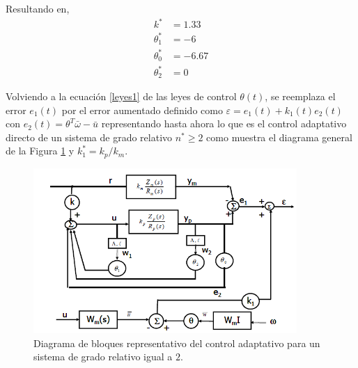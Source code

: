 \documentclass[letterpaper,11pt]{article} %
\begin{document}
Resultando en,
\begin{align}
	k^* &= 1.33\nonumber \\
	\theta_1^* &= -6 \nonumber \\
	\theta_0^* &= -6.67 \nonumber \\
	\theta_2^* &= 0
\end{align}


Volviendo a la ecuación \eqref{leyes1} de las leyes de control $\theta(t)$, se reemplaza el error $e_1(t)$ por el error aumentado definido como $\varepsilon = e_1(t) + k_1(t)e_2(t)$ con $e_2(t) = \theta^T \bar{\omega} - \bar{u}$ representando hasta ahora lo que es el control adaptativo directo de un sistema de grado relativo $n^* \geq 2$ como muestra el diagrama general de la Figura \ref{control1} y $k_1^* = k_p/k_m$.

\begin{figure}[h]
	\centering
	\captionsetup{justification=centering}
	\includegraphics[width=10cm]{control2.png}
	\caption{Diagrama de bloques representativo del control adaptativo para un sistema de grado relativo igual a $2$.}
	\label{control1}
\end{figure}
\end{document}
